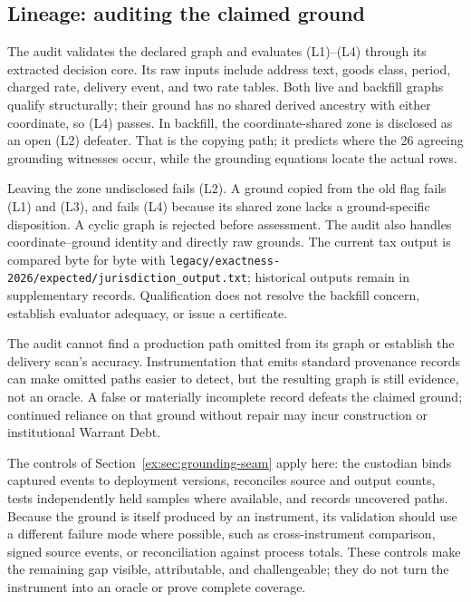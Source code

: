 \documentclass[smallextended,envcountsect,envcountsame,natbib]{svjour3}
\begin{document}
\subsection{Lineage: auditing the claimed ground}\label{ex:sec:case-audit}

The audit validates the declared graph and evaluates (L1)--(L4) through its extracted decision core. Its raw inputs include address text, goods class, period, charged rate, delivery event, and two rate tables. Both live and backfill graphs qualify structurally; their ground has no shared derived ancestry with either coordinate, so (L4) passes. In backfill, the coordinate-shared zone is disclosed as an open (L2) defeater. That is the copying path; it predicts where the 26 agreeing grounding witnesses occur, while the grounding equations locate the actual rows.

Leaving the zone undisclosed fails (L2). A ground copied from the old flag fails (L1) and (L3), and fails (L4) because its shared zone lacks a ground-specific disposition. A cyclic graph is rejected before assessment. The audit also handles coordinate--ground identity and directly raw grounds. The current tax output is compared byte for byte with \nolinkurl{legacy/exactness-2026/expected/jurisdiction_output.txt}; historical outputs remain in supplementary records. Qualification does not resolve the backfill concern, establish evaluator adequacy, or issue a certificate.

The audit cannot find a production path omitted from its graph or establish the delivery scan's accuracy. Instrumentation that emits standard provenance records can make omitted paths easier to detect, but the resulting graph is still evidence, not an oracle. A false or materially incomplete record defeats the claimed ground; continued reliance on that ground without repair may incur construction or institutional Warrant Debt.

The controls of Section~\ref{ex:sec:grounding-seam} apply here: the custodian binds captured events to deployment versions, reconciles source and output counts, tests independently held samples where available, and records uncovered paths. Because the ground is itself produced by an instrument, its validation should use a different failure mode where possible, such as cross-instrument comparison, signed source events, or reconciliation against process totals. These controls make the remaining gap visible, attributable, and challengeable; they do not turn the instrument into an oracle or prove complete coverage.
\end{document}
